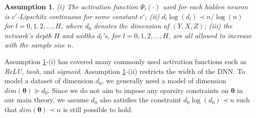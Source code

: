 \documentclass[11pt]{article}
\newcommand{\bx}{{\boldsymbol x}}
\newcommand{\btheta}{{\boldsymbol \theta}}
\newtheorem{assumption}{Assumption}
\begin{document}
\begin{assumption} \label{ass3}  
(i) The activation function $\Psi_l(\cdot)$ used for each hidden neuron is $c'$-Lipschitz continuous for some constant $c'$;   (ii) $d_l \log(d_l)  \prec n/\log(n)$ for $l=0,1,2,\ldots, H$, where $d_0$ 
denotes the dimension of $(Y,X,Z)$; (iii) the network's depth $H$ and widths $d_l$'s, for $l=0,1,2,\ldots,H$, are all allowed to increase with the sample size $n$.
\end{assumption}

Assumption \ref{ass3}-(i) has covered many commonly used activation functions such as 
{\it ReLU}, {\it tanh}, and {\it sigmoid}. 
Assumption \ref{ass3}-(ii) restricts the width of the DNN.
To model a dataset of dimension $d_0$, we generally need a model of dimension 
$dim(\btheta) \succeq d_0$. Since we do not aim to impose any sparsity constraints on $\btheta$ in our main theory, we assume 
 $d_0$ also satisfies the constraint $d_0 \log (d_0) \prec n$ such that 
$dim(\btheta) \prec n$ is still possible to hold.  


\end{document}
